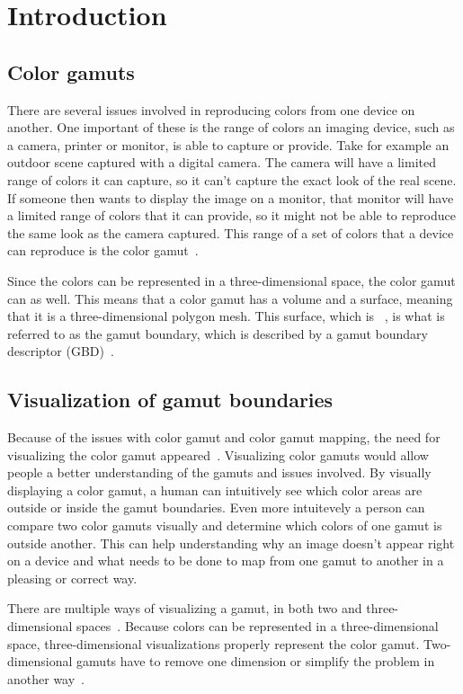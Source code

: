 \section{Introduction}

\subsection{Color gamuts}
There are several issues involved in reproducing colors from one device on another.
One important of these is the range of colors an imaging device, such as a camera, printer or monitor, is able to capture or provide.
Take for example an outdoor scene captured with a digital camera.
The camera will have a limited range of colors it can capture, so it can't capture the exact look of the real scene.
If someone then wants to display the image on a monitor, that monitor will have a limited range of colors that it can provide, so it might not be able to reproduce the same look as the camera captured.
This range of a set of colors that a device can reproduce is the color gamut~\cite{GamutMapping,HandbookGamutMapping}.

Since the colors can be represented in a three-dimensional space, the color gamut can as well.
This means that a color gamut has a volume and a surface, meaning that it is a three-dimensional polygon mesh.
This surface, which is ~\cite{ColourImageScience}, is what is referred to as the gamut boundary, which is described by a gamut boundary descriptor (GBD)~\cite{HandbookGamutMapping}.

\subsection{Visualization of gamut boundaries}
\label{sec:intro-gbd-viz}
Because of the issues with color gamut and color gamut mapping, the need for visualizing the color gamut appeared~\cite{InteractiveGamutMapping}.
Visualizing color gamuts would allow people a better understanding of the gamuts and issues involved.
By visually displaying a color gamut, a human can intuitively see which color areas are outside or inside the gamut boundaries.
Even more intuitevely a person can compare two color gamuts visually and determine which colors of one gamut is outside another.
This can help understanding why an image doesn't appear right on a device and what needs to be done to map from one gamut to another in a pleasing or correct way.

There are multiple ways of visualizing a gamut, in both two and three-dimensional spaces~\cite{ColourImaging,InteractiveGamutMapping}.
Because colors can be represented in a three-dimensional space, three-dimensional visualizations properly represent the color gamut.
Two-dimensional gamuts have to remove one dimension or simplify the problem in another way~\cite{InteractiveGamutMapping}.

